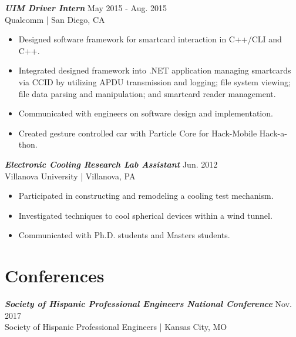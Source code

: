 \documentclass[letter]{res}
\begin{document}
\begin{resume}
\vspace{-2mm}

{\sl \textbf{UIM Driver Intern}} \hfill May 2015 - Aug. 2015\\
Qualcomm | San Diego, CA \newline
 
 \vspace{-4mm}
 
 \begin{itemize}
 \item Designed software framework for smartcard interaction in C++/CLI and C++.
 \item Integrated designed framework into .NET application managing smartcards via CCID by utilizing APDU transmission and logging; file system viewing; file data parsing and manipulation; and smartcard reader management.
 \item Communicated with engineers on software design and implementation.
 \item Created gesture controlled car with Particle Core for Hack-Mobile Hack-a-thon.
 \end{itemize}
 
\vspace{-2mm}

{\sl \textbf{Electronic Cooling Research Lab Assistant}} \hfill Jun. 2012\\
Villanova University | Villanova, PA \newline
 
 \vspace{-4mm}
 
 \begin{itemize}
 \item Participated in constructing and remodeling a cooling test mechanism.
 \item Investigated techniques to cool spherical devices within a wind tunnel.
 \item Communicated with Ph.D. students and Masters students.
 \end{itemize}
 
\vspace{-4mm}

\section{Conferences}

{\sl \textbf{Society of Hispanic Professional Engineers National Conference}} \hfill Nov. 2017\\
 Society of Hispanic Professional Engineers | Kansas City, MO \newline


\end{resume}
\end{document}
